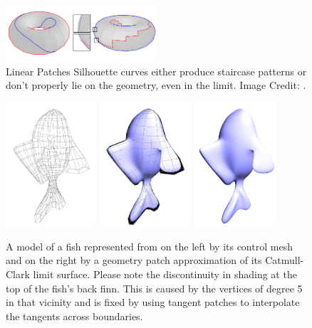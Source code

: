 \documentclass[12pt, letterpaper]{article}
\begin{document}
		\begin{figure}[h]
		\centering
		\includegraphics[width=0.5\textwidth]{Eisemann08_linear_patches}
		\caption{Linear Patches Silhouette curves either produce staircase patterns or don't properly lie on the geometry, even in the limit. Image Credit: \cite{Eisemann08}.}
		\label{fig:Eisemann_linear_patches}
		\end{figure}

		\begin{figure}[h]
		\centering
		\includegraphics[width=0.3\textwidth]{fish_cm}
		\includegraphics[width=0.3\textwidth]{fish_cm_and_patch}
		\includegraphics[width=0.275\textwidth]{fish_patch}
		\caption{A model of a fish represented from on the left by its control mesh and on the right by a geometry patch approximation of its Catmull-Clark limit surface. 
				Please note the discontinuity in shading at the top of the fish's back finn.
				This is caused by the vertices of degree 5 in that vicinity and is fixed by using tangent patches to interpolate the tangents across boundaries.}
		\label{fig:subDDef}
		\end{figure}
\end{document}
